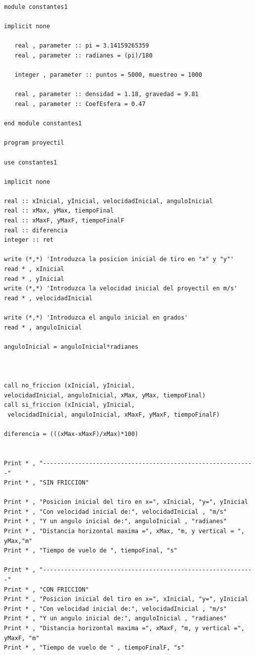 \documentclass[10pt]{article}
\begin{document}
\begin{verbatim}
module constantes1

implicit none

   real , parameter :: pi = 3.14159265359
   real , parameter :: radianes = (pi)/180

   integer , parameter :: puntos = 5000, muestreo = 1000

   real , parameter :: densidad = 1.18, gravedad = 9.81
   real , parameter :: CoefEsfera = 0.47

end module constantes1

program proyectil

use constantes1

implicit none

real :: xInicial, yInicial, velocidadInicial, anguloInicial 
real :: xMax, yMax, tiempoFinal
real :: xMaxF, yMaxF, tiempoFinalF
real :: diferencia
integer :: ret

write (*,*) 'Introduzca la posicion inicial de tiro en "x" y "y"'
read * , xInicial
read * , yInicial
write (*,*) 'Introduzca la velocidad inicial del proyectil en m/s'
read * , velocidadInicial

write (*,*) 'Introduzca el angulo inicial en grados'
read * , anguloInicial

anguloInicial = anguloInicial*radianes


 
call no_friccion (xInicial, yInicial, 
velocidadInicial, anguloInicial, xMax, yMax, tiempoFinal)
call si_friccion (xInicial, yInicial,
 velocidadInicial, anguloInicial, xMaxF, yMaxF, tiempoFinalF)

diferencia = (((xMax-xMaxF)/xMax)*100)


Print * , "------------------------------------------------------------"
Print * , "SIN FRICCION"

Print * , "Posicion inicial del tiro en x=", xInicial, "y=", yInicial
Print * , "Con velocidad inicial de:", velocidadInicial , "m/s"
Print * , "Y un angulo inicial de:", anguloInicial , "radianes"
Print * , "Distancia horizontal maxima =", xMax, "m, y vertical = ", yMax,"m"
Print * , "Tiempo de vuelo de ", tiempoFinal, "s"

Print * , "------------------------------------------------------------"
Print * , "CON FRICCION"
Print * , "Posicion inicial del tiro en x=", xInicial, "y=", yInicial
Print * , "Con velocidad inicial de:", velocidadInicial , "m/s"
Print * , "Y un angulo inicial de:", anguloInicial , "radianes"
Print * , "Distancia horizontal maxima =", xMaxF, "m, y vertical =", yMaxF, "m"
Print * , "Tiempo de vuelo de " , tiempoFinalF, "s"


\end{verbatim}
\end{document}
